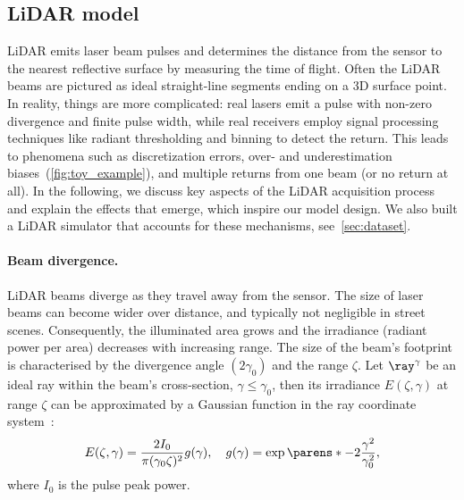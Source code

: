 \subsection{LiDAR model}
\label{sec:lidar_model}

LiDAR emits laser beam pulses and determines the distance from the sensor to the nearest reflective surface by measuring the time of flight. 
Often the LiDAR beams are pictured as ideal straight-line segments ending on a 3D surface point. In reality, things are more complicated: real lasers emit a pulse with non-zero divergence and finite pulse width, while real receivers employ signal processing techniques like radiant thresholding and binning to detect the return. This leads to phenomena such as discretization errors, over- and underestimation biases~(\cf \cref{fig:toy_example}), and multiple returns from one beam (or no return at all). 
In the following, we discuss key aspects of the LiDAR acquisition process and explain the effects that emerge, which inspire our model design. We also built a LiDAR simulator that accounts for these mechanisms, see~\cref{sec:dataset}.


\paragraph{Beam divergence.}
LiDAR beams diverge as they travel away from the sensor. The size of laser beams can become wider over distance, and typically not negligible in street scenes. Consequently, the illuminated area grows and the irradiance (radiant power per area) decreases with increasing range.
The size of the beam's footprint is characterised by the divergence angle $(2\gamma_0)$ and the range $\zeta$. Let $\ray^{\gamma}$ be an ideal ray within the beam's cross-section, $\gamma \leq \gamma_0$, then its irradiance $E(\zeta, \gamma)$ at range $\zeta$ can be approximated by a Gaussian function in the ray coordinate system~\cite{wagner2006gaussian}:
\begin{equation}
    E(\zeta, \gamma) =\frac{2I_0}{\pi (\gamma_0 \zeta)^2} g(\gamma), \quad g(\gamma) = \exp\parens*{-2 \frac{\gamma^2}{\gamma_0^2}},
\end{equation}
where $I_0$ is the pulse peak power. %


